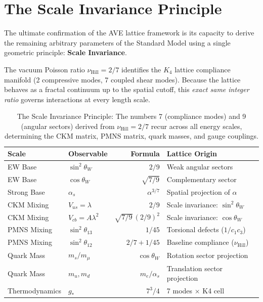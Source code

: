 \section{The Scale Invariance Principle}
\label{sec:scale_invariance}

The ultimate confirmation of the AVE lattice framework is its capacity
to derive the remaining arbitrary parameters of the Standard Model using
a single geometric principle: \textbf{Scale Invariance}.

The vacuum Poisson ratio $\nu_{\text{Hill}} = 2/7$ identifies the $K_4$
lattice compliance manifold (2 compressive modes, 7 coupled shear modes).
Because the lattice behaves as a fractal continuum up to the spatial
cutoff, this \emph{exact same integer ratio} governs interactions at
every length scale.

\begin{table}[h]
\centering
\small
\begin{tabular}{llrl}
\toprule
\textbf{Scale} & \textbf{Observable} & \textbf{Formula} & \textbf{Lattice Origin} \\
\midrule
EW Base     & $\sin^2\theta_W$ & $2/9$ & Weak angular sectors \\
EW Base     & $\cos\theta_W$ & $\sqrt{7/9}$ & Complementary sector \\
Strong Base & $\alpha_s$ & $\alpha^{3/7}$ & Spatial projection of $\alpha$ \\
CKM Mixing  & $V_{us} = \lambda$ & $2/9$ & Scale invariance: $\sin^2\theta_W$ \\
CKM Mixing  & $V_{cb} = A\lambda^2$ & $\sqrt{7/9}\,(2/9)^2$ & Scale invariance: $\cos\theta_W$ \\
PMNS Mixing & $\sin^2\theta_{13}$ & $1/45$ & Torsional defects ($1/c_1c_3$) \\
PMNS Mixing & $\sin^2\theta_{12}$ & $2/7 + 1/45$ & Baseline compliance ($\nu_{\text{Hill}}$) \\
Quark Mass  & $m_s / m_\mu$ & $\cos\theta_W$ & Rotation sector projection \\
Quark Mass  & $m_u, m_d$ & $m_e/\alpha_s$ & Translation sector projection \\
Thermodynamics & $g_*$ & $7^3/4$ & 7 modes $\times$ K4 cell \\
\bottomrule
\end{tabular}
\caption{The Scale Invariance Principle: The numbers 7 (compliance modes)
and 9 (angular sectors) derived from $\nu_{\text{Hill}} = 2/7$ recur across
all energy scales, determining the CKM matrix, PMNS matrix, quark
masses, and gauge couplings.}
\label{tab:scale_invariance}
\end{table}

